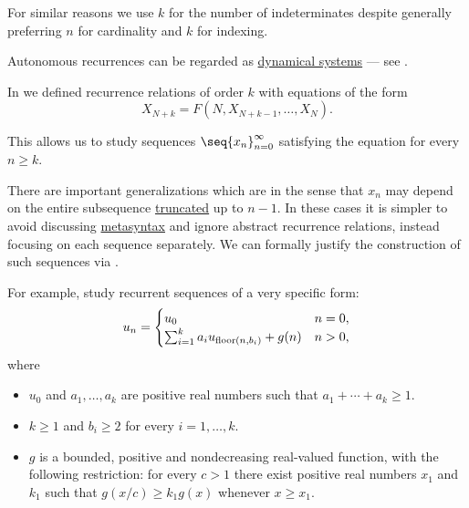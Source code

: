 \begin{comments}
  For similar reasons we use \( k \) for the number of indeterminates despite generally preferring \( n \) for cardinality and \( k \) for indexing.

  \item Autonomous recurrences can be regarded as \hyperref[def:dynamical_system]{dynamical systems} --- see .
\end{comments}

\begin{remark}\label{rem:unrestricted_recurrence_relation}
  In  we defined recurrence relations of  order \( k \) with equations of the form
  \begin{equation*}
    X_{N+k} = F(N, X_{N+k-1}, \ldots, X_N).
  \end{equation*}

  This allows us to study sequences \( \seq{ x_n }_{n=0}^\infty \) satisfying the equation for every \( n \geq k \).

  There are important generalizations which are  in the sense that \( x_n \) may depend on the entire subsequence \hyperref[def:truncated_sequence]{truncated} up to \( n - 1 \). In these cases it is simpler to avoid discussing \hyperref[con:metalanguage]{metasyntax} and ignore abstract recurrence relations, instead focusing on each sequence separately. We can formally justify the construction of such sequences via .

  For example,  study recurrent sequences of a very specific form:
  \begin{equation*}
    u_n = \begin{cases}
      u_0                                        &n = 0, \\
      \sum_{i=1}^k a_i u_{\operatorname{floor}(n, b_i)} + g(n) &n > 0,
    \end{cases}
  \end{equation*}
  where
  \begin{itemize}
    \item \( u_0 \) and \( a_1, \ldots, a_k \) are positive real numbers such that \( a_1 + \cdots + a_k \geq 1 \).
    \item \( k \geq 1 \) and \( b_i \geq 2 \) for every \( i = 1, \ldots, k \).
    \item \( g \) is a bounded, positive and nondecreasing real-valued function, with the following restriction: for every \( c > 1 \) there exist positive real numbers \( x_1 \) and \( k_1 \) such that \( g(x / c) \geq k_1 g(x) \) whenever \( x \geq x_1 \).
  \end{itemize}
\end{remark}


